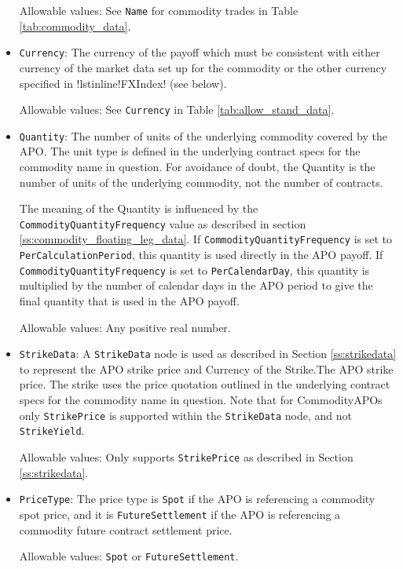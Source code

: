\begin{itemize}
Allowable values:  See \lstinline!Name! for commodity trades in Table \ref{tab:commodity_data}.

\item \lstinline!Currency!: The currency of the payoff which must be consistent with either currency of the market data set up for the commodity or the other currency specified in !lstinline!FXIndex! (see below).

Allowable values: See \lstinline!Currency!  in Table \ref{tab:allow_stand_data}.

\item \lstinline!Quantity!:  The number of units of the underlying commodity covered by the APO. The unit type is defined in the underlying contract specs for the commodity name in question. For avoidance of doubt, the Quantity is the number of units of the underlying commodity, not the number of contracts.

The meaning of the Quantity is influenced by the \lstinline!CommodityQuantityFrequency! value as described in section \ref{ss:commodity_floating_leg_data}. If \lstinline!CommodityQuantityFrequency! is set to \lstinline!PerCalculationPeriod!, this quantity is used directly in the APO payoff. If \lstinline!CommodityQuantityFrequency! is set to \lstinline!PerCalendarDay!, this quantity is multiplied by the number of calendar days in the APO period to give the final quantity that is used in the APO payoff.

Allowable values: Any positive real number.

\item \lstinline!StrikeData!: A \lstinline!StrikeData! node is used as described in Section \ref{ss:strikedata} to represent the APO strike price and Currency of the Strike.The APO strike price. The strike uses the price quotation outlined in the underlying contract specs for the commodity name in question. Note that for CommodityAPOs only \lstinline!StrikePrice!  is supported within the \lstinline!StrikeData! node, and not \lstinline!StrikeYield!. 

Allowable values: Only supports \lstinline!StrikePrice! as described in Section \ref{ss:strikedata}.

\item \lstinline!PriceType!: The price type is \lstinline!Spot! if the APO is referencing a commodity spot price, and it is \lstinline!FutureSettlement! if the APO is referencing a commodity future contract settlement price.

Allowable values: \lstinline!Spot! or \lstinline!FutureSettlement!.


\end{itemize}
